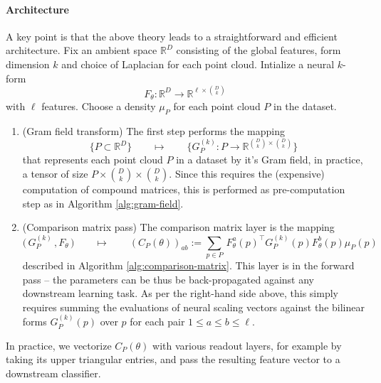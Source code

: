 \documentclass{article}
\newcommand{\R}{\mathbb{R}}
\theoremstyle{remark}
\theoremstyle{plain}
\begin{document}
\paragraph{Architecture} A key point is that the above theory leads to a straightforward and efficient architecture. Fix an ambient space $\R^D$ consisting of the global features, form dimension $k$ and choice of Laplacian for each point cloud. Intialize a neural $k$-form 
\begin{equation} 
F_\theta: \R^D \to \R^{\ell \times \binom{D}{k}}
\end{equation} with $\ell$ features. Choose a density $\mu_P$ for each point cloud $P$ in the dataset.
\begin{enumerate}
    \item (Gram field transform) The first step performs the mapping
    \begin{equation} 
\Big\{ P \subset \R^D \Big\} \hspace{2em} \mapsto \hspace{2em} \Big\{ G_P^{(k)} : P \to  \R^{\binom{D}{k} \times \binom{D}{k}} \Big\}  
\end{equation} that represents each point cloud $P$ in a dataset by it's Gram field, in practice, a tensor of size $P \times \binom{D}{k} \times \binom{D}{k}$. Since this requires the (expensive) computation of compound matrices, this is performed as pre-computation step as in Algorithm \ref{alg:gram-field}.
\item (Comparison matrix pass) The comparison matrix layer is the mapping
 \begin{equation} 
\big(\,G_P^{(k)}\, , F_\theta \, \big)  \hspace{2em} \mapsto \hspace{2em}\left(C_P(\theta)\right)_{ab} := 
\sum_{p\in P}
\,
F_{\theta}^{a}(p)^\top
G_P^{(k)}(p)
F_{\theta}^{b}(p) \mu_P(p)
\end{equation} described in Algorithm  \ref{alg:comparison-matrix}. This layer is in the forward pass -- the parameters can be thus be back-propagated against any downstream learning task. As per the right-hand side above, this simply requires summing the evaluations of neural scaling vectors against the bilinear forms $G_P^{(k)}(p)$ over $p$ for each pair $1 \leq a\leq b \leq \ell$.  
\end{enumerate} In practice, we vectorize $C_P(\theta)$ with various readout layers, for example
by taking its upper triangular entries, and pass the resulting feature vector to a downstream classifier. 
\end{document}
